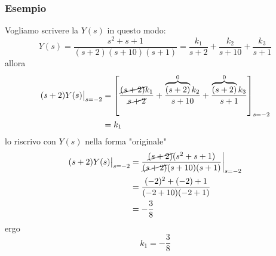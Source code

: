 \documentclass{article}
\numberwithin{equation}{subsection}
\begin{document}
\subsubsection{Esempio}
Vogliamo scrivere la $Y(s)$ in questo modo:
\[
    Y(s) = \frac{s^2+s+1}{(s+2)(s+10)(s+1)} = \frac{k_1}{s+2} + \frac{k_2}{s+10} + \frac{k_3}{s+1}
\]
allora
\begin{align*}
    (s+2)Y(s) \big|_{s=-2} &= \left[\frac{\cancel{(s+2)}k_1}{\cancel{s+2}} + \frac{\overbrace{(s+2)}^{0}k_2}{s+10} + \frac{\overbrace{(s+2)}^{0}k_3}{s+1}\right]_{s=-2}\\
    &= k_1
\end{align*}
lo riscrivo con $Y(s)$ nella forma "originale"
\begin{align*}
    (s+2)Y(s) \big|_{s=-2} &= 
    \frac{\cancel{(s+2)}(s^2+s+1)}{\cancel{(s+2)}(s+10)(s+1)} \bigg|_{s=-2}\\
    &=\frac{(-2)^2 + (-2)+1}{(-2+10)(-2+1)} \\
    &= - \frac{3}{8}
\end{align*}
ergo
\[
    k_1 = - \frac{3}{8}
\]
\end{document}
